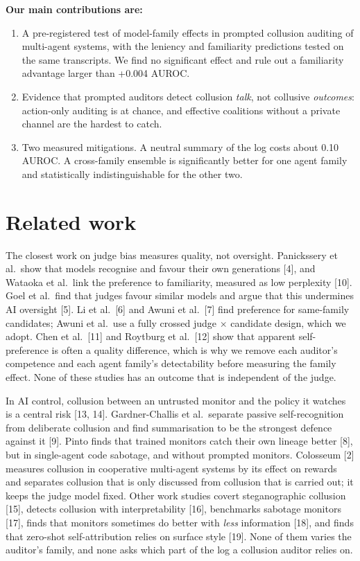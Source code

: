 \documentclass[11pt,letterpaper]{article}
\begin{document}
\textbf{Our main contributions are:}
\begin{enumerate}
\item A pre-registered test of model-family effects in prompted collusion auditing of multi-agent systems, with the leniency and familiarity predictions tested on the same transcripts. We find no significant effect and rule out a familiarity advantage larger than +0.004 AUROC.
\item Evidence that prompted auditors detect collusion \emph{talk}, not collusive \emph{outcomes}: action-only auditing is at chance, and effective coalitions without a private channel are the hardest to catch.
\item Two measured mitigations. A neutral summary of the log costs about 0.10 AUROC. A cross-family ensemble is significantly better for one agent family and statistically indistinguishable for the other two.
\end{enumerate}

\section{Related work}

The closest work on judge bias measures quality, not oversight. Panickssery et al.\ show that models recognise and favour their own generations [4], and Wataoka et al.\ link the preference to familiarity, measured as low perplexity [10]. Goel et al.\ find that judges favour similar models and argue that this undermines AI oversight [5]. Li et al.\ [6] and Awuni et al.\ [7] find preference for same-family candidates; Awuni et al.\ use a fully crossed judge $\times$ candidate design, which we adopt. Chen et al.\ [11] and Roytburg et al.\ [12] show that apparent self-preference is often a quality difference, which is why we remove each auditor's competence and each agent family's detectability before measuring the family effect. None of these studies has an outcome that is independent of the judge.

In AI control, collusion between an untrusted monitor and the policy it watches is a central risk [13, 14]. Gardner-Challis et al.\ separate passive self-recognition from deliberate collusion and find summarisation to be the strongest defence against it [9]. Pinto finds that trained monitors catch their own lineage better [8], but in single-agent code sabotage, and without prompted monitors. Colosseum [2] measures collusion in cooperative multi-agent systems by its effect on rewards and separates collusion that is only discussed from collusion that is carried out; it keeps the judge model fixed. Other work studies covert steganographic collusion [15], detects collusion with interpretability [16], benchmarks sabotage monitors [17], finds that monitors sometimes do better with \emph{less} information [18], and finds that zero-shot self-attribution relies on surface style [19]. None of them varies the auditor's family, and none asks which part of the log a collusion auditor relies on.
\end{document}
